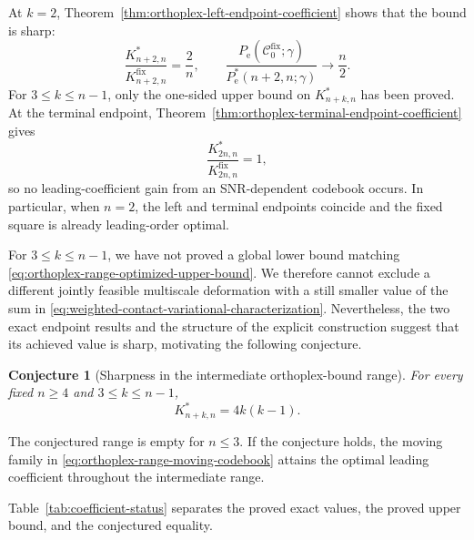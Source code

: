 \documentclass[12pt,draftclsnofoot,onecolumn]{IEEEtran}
\newcommand{\cC}{\mathcal{C}}
\newcommand{\Pe}{P_{\mathrm e}}
\newtheorem{conjecture}{Conjecture}
\theoremstyle{definition}
\begin{document}
At \(k=2\),
Theorem~\ref{thm:orthoplex-left-endpoint-coefficient} shows that the
bound is sharp:
\begin{equation}
  \frac{K^{\ast}_{n+2,n}}{K^{\mathrm{fix}}_{n+2,n}}
  =\frac{2}{n},
  \qquad
  \frac{\Pe(\cC_0^{\mathrm{fix}};\gamma)}
       {\Pe^{\ast}(n+2,n;\gamma)}
  \longrightarrow\frac{n}{2}.
  \label{eq:orthoplex-left-endpoint-fixed-moving-comparison}
\end{equation}
For \(3\leq k\leq n-1\), only the one-sided upper bound on
\(K^{\ast}_{n+k,n}\)
has been proved.  At the terminal endpoint,
Theorem~\ref{thm:orthoplex-terminal-endpoint-coefficient} gives
\begin{equation}
  \frac{K^{\ast}_{2n,n}}{K^{\mathrm{fix}}_{2n,n}}=1,
  \label{eq:orthoplex-terminal-endpoint-fixed-comparison}
\end{equation}
so no leading-coefficient gain from an SNR-dependent codebook occurs.
In particular, when \(n=2\), the
left and terminal endpoints coincide and the fixed square is already
leading-order optimal.

For \(3\leq k\leq n-1\), we have not proved a global lower bound
matching \eqref{eq:orthoplex-range-optimized-upper-bound}.  We therefore
cannot exclude a different jointly feasible multiscale deformation with
a still smaller value of the sum in
\eqref{eq:weighted-contact-variational-characterization}.  Nevertheless, the two exact
endpoint results and the structure of the explicit construction suggest
that its achieved value is sharp, motivating the following conjecture.

\begin{conjecture}[Sharpness in the intermediate orthoplex-bound range]
\label{conj:orthoplex-intermediate-sharpness}
For every fixed \(n\ge4\) and \(3\leq k\leq n-1\),
\begin{equation}
  K^{\ast}_{n+k,n}=4k(k-1).
  \label{eq:orthoplex-intermediate-conjecture}
\end{equation}
\end{conjecture}

The conjectured range is empty for \(n\le3\).  If the conjecture holds,
the moving family in \eqref{eq:orthoplex-range-moving-codebook} attains the
optimal leading coefficient throughout the intermediate range.

Table~\ref{tab:coefficient-status} separates the proved exact values,
the proved upper bound, and the conjectured equality.
\end{document}
